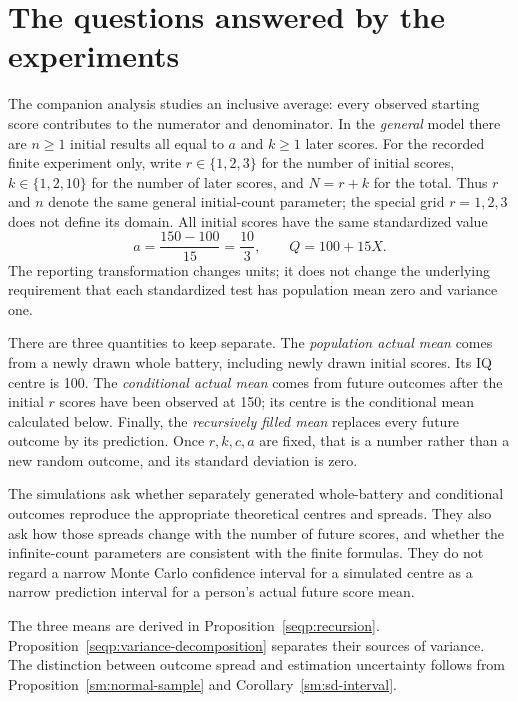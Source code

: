 \tableofcontents
\mainmatter

\chapter{The questions answered by the experiments}
\label{sec:seq-sim-questions}

The companion analysis studies an inclusive average: every observed
starting score contributes to the numerator and denominator. In the
\emph{general} model there are \(n\geq1\) initial results all equal to
\(a\) and \(k\geq1\) later scores. For the recorded finite experiment
only, write \(r\in\{1,2,3\}\) for the number of initial scores,
\(k\in\{1,2,10\}\) for the number of later scores, and \(N=r+k\) for
the total. Thus \(r\) and \(n\) denote the same general initial-count
parameter; the special grid \(r=1,2,3\) does not define its domain. All initial
scores have the same standardized value
\[
 a=\frac{150-100}{15}=\frac{10}{3},\qquad Q=100+15X.
\]
The reporting transformation changes units; it does not change the
underlying requirement that each standardized test has population mean
zero and variance one.

There are three quantities to keep separate. The \emph{population actual
mean} comes from a newly drawn whole battery, including newly drawn
initial scores. Its IQ centre is 100. The \emph{conditional actual mean}
comes from future outcomes after the initial \(r\) scores have been
observed at 150; its centre is the conditional mean calculated below.
Finally, the \emph{recursively filled mean} replaces every future outcome
by its prediction. Once \(r,k,c,a\) are fixed, that is a number rather
than a new random outcome, and its standard deviation is zero.

The simulations ask whether separately generated whole-battery and
conditional outcomes reproduce the appropriate theoretical centres and
spreads. They also ask how those spreads change with the number of
future scores, and whether the infinite-count parameters are consistent
with the finite formulas. They do not regard a narrow Monte Carlo
confidence interval for a simulated centre as a narrow prediction
interval for a person's actual future score mean.

The three means are derived in Proposition~\ref{seqp:recursion}.
Proposition~\ref{seqp:variance-decomposition} separates their sources of
variance. The distinction between outcome spread and estimation uncertainty
follows from Proposition~\ref{sm:normal-sample} and
Corollary~\ref{sm:sd-interval}.

